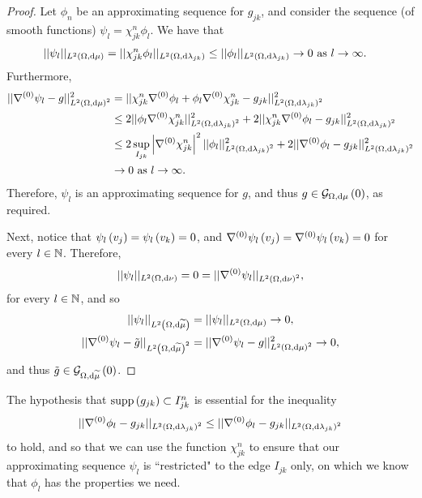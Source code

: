 \begin{proof}
	Let $\phi_n$ be an approximating sequence for $g_{jk}$, and consider the sequence (of smooth functions) $\psi_l = \chi_{jk}^n\phi_l$.
	We have that
	\begin{align*}
		\lvert\lvert \psi_l \rvert\rvert_{L^{2}\left( \Omega,\mathrm{d}\mu \right)} 
		&= \lvert\lvert \chi_{jk}^n\phi_l \rvert\rvert_{L^{2}\left( \Omega,\mathrm{d}\lambda_{jk} \right)}
		\leq \lvert\lvert \phi_l \rvert\rvert_{L^{2}\left( \Omega,\mathrm{d}\lambda_{jk} \right)} \rightarrow 0 \ \text{as} \ l \rightarrow\infty.
	\end{align*}
	Furthermore,
	\begin{align*}
		\lvert\lvert \nabla^{(0)}\psi_l - g \rvert\rvert_{L^{2}\left( \Omega,\mathrm{d}\mu \right)^2}^2
		&= \lvert\lvert \chi_{jk}^n\nabla^{(0)}\phi_l + \phi_l\nabla^{(0)}\chi_{jk}^n - g_{jk} \rvert\rvert_{L^{2}\left( \Omega,\mathrm{d}\lambda_{jk} \right)^2}^2 \\
		&\leq 2\lvert\lvert \phi_l\nabla^{(0)}\chi_{jk}^n \rvert\rvert_{L^{2}\left( \Omega,\mathrm{d}\lambda_{jk} \right)^2}^2 + 2\lvert\lvert \chi_{jk}^n\nabla^{(0)}\phi_l - g_{jk} \rvert\rvert_{L^{2}\left( \Omega,\mathrm{d}\lambda_{jk} \right)^2}^2 \\
		&\leq 2\sup_{I_{jk}}\left\lvert \nabla^{(0)}\chi_{jk}^n \right\rvert^2 \lvert\lvert \phi_l \rvert\rvert_{L^{2}\left( \Omega,\mathrm{d}\lambda_{jk} \right)^2}^2
		+ 2\lvert\lvert \nabla^{(0)}\phi_l - g_{jk} \rvert\rvert_{L^{2}\left( \Omega,\mathrm{d}\lambda_{jk} \right)^2}^2 \\
		&\rightarrow 0 \ \text{as} \ l \rightarrow\infty.
	\end{align*}
	Therefore, $\psi_l$ is an approximating sequence for $g$, and thus $g\in\mathcal{G}_{ \Omega, \mathrm{d}\mu}\left( 0 \right)$, as required.
	
	Next, notice that $\psi_l\left( v_j \right) = \psi_l\left( v_k \right) = 0$, and $\nabla^{(0)}\psi_l\left( v_j \right) = \nabla^{(0)}\psi_l\left( v_k \right) = 0$ for every $l\in\mathbb{N}$.
	Therefore,
	\begin{align*}
		\lvert\lvert \psi_l \rvert\rvert_{L^{2}\left( \Omega,\mathrm{d}\nu \right)} = 0 = \lvert\lvert \nabla^{(0)}\psi_l \rvert\rvert_{L^{2}\left( \Omega,\mathrm{d}\nu \right)^2},
	\end{align*}
	for every $l\in\mathbb{N}$, and so
	\begin{align*}
		\lvert\lvert \psi_l \rvert\rvert_{L^{2}\left( \Omega,\mathrm{d}\widetilde{\mu} \right)} &= \lvert\lvert \psi_l \rvert\rvert_{L^{2}\left( \Omega,\mathrm{d}\mu \right)} \rightarrow 0, \\
		\lvert\lvert \nabla^{(0)}\psi_l - \tilde{g} \rvert\rvert_{L^{2}\left( \Omega,\mathrm{d}\widetilde{\mu} \right)^2} &= \lvert\lvert \nabla^{(0)}\psi_l - g \rvert\rvert_{L^{2}\left( \Omega,\mathrm{d}\mu \right)^2}^2 \rightarrow 0,
	\end{align*}
	and thus $\tilde{g}\in\mathcal{G}_{ \Omega, \mathrm{d}\widetilde{\mu}}\left( 0 \right)$.
\end{proof}
The hypothesis that $\mathrm{supp}\left( g_{jk} \right)\subset I_{jk}^n$ is essential for the inequality 
\begin{align*}
	\lvert\lvert \nabla^{(0)}\phi_l - g_{jk} \rvert\rvert_{L^{2}\left( \Omega,\mathrm{d}\lambda_{jk} \right)^2} \leq \lvert\lvert \nabla^{(0)}\phi_l - g_{jk} \rvert\rvert_{L^{2}\left( \Omega,\mathrm{d}\lambda_{jk} \right)^2}
\end{align*} 
to hold, and so that we can use the function $\chi_{jk}^n$ to ensure that our approximating sequence $\psi_l$ is ``restricted" to the edge $I_{jk}$ only, on which we know that $\phi_l$ has the properties we need.

